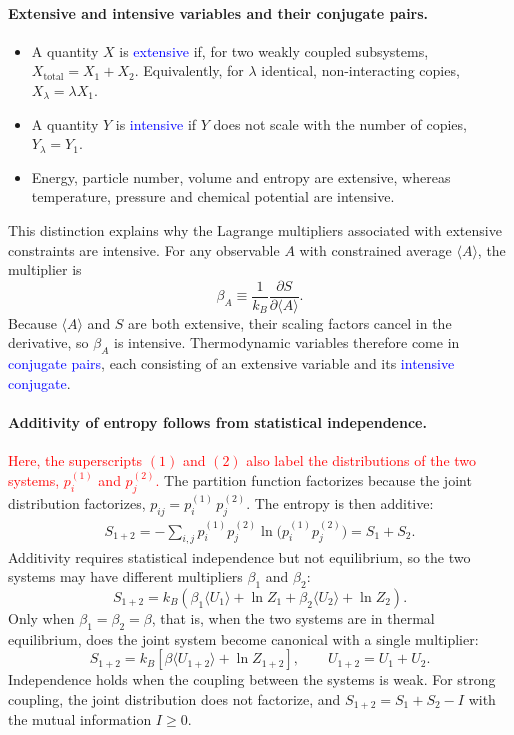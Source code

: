 \paragraph{Extensive and intensive variables and their conjugate pairs.}
\begin{itemize}
    \item A quantity $X$ is \textcolor{blue}{extensive} if, for two weakly
    coupled subsystems, $X_{\mathrm{total}}=X_1+X_2$. Equivalently, for
    $\lambda$ identical, non-interacting copies, $X_\lambda=\lambda X_1$.
    \item A quantity $Y$ is \textcolor{blue}{intensive} if $Y$ does not scale
    with the number of copies, $Y_\lambda=Y_1$.
    \item Energy, particle number, volume and entropy are extensive, whereas
    temperature, pressure and chemical potential are intensive.
\end{itemize}
This distinction explains why the Lagrange multipliers associated with
extensive constraints are intensive. For any observable $A$ with constrained
average $\langle A\rangle$, the multiplier is
\begin{equation*}
    \beta_A\equiv\frac{1}{k_B}\frac{\partial S}{\partial\langle A\rangle}.
\end{equation*}
Because $\langle A\rangle$ and $S$ are both extensive, their scaling factors
cancel in the derivative, so $\beta_A$ is intensive. Thermodynamic variables
therefore come in \textcolor{blue}{conjugate pairs}, each consisting of an
extensive variable and its \textcolor{blue}{intensive conjugate}.

\paragraph{Additivity of entropy follows from statistical independence.}
\textcolor{red}{Here, the superscripts $(1)$ and $(2)$ also label the
distributions of the two systems, $p^{(1)}_i$ and $p^{(2)}_j$.}
The partition function factorizes because the joint distribution
factorizes, $p_{ij}=p^{(1)}_i\,p^{(2)}_j$. The entropy is then additive:
\begin{align*}
    S_{1+2}
    = -\sum_{i,j} p^{(1)}_i p^{(2)}_j
    \ln\!\big(p^{(1)}_i p^{(2)}_j\big)
    = S_1+S_2.
\end{align*}
Additivity requires statistical independence but not equilibrium, so the two
systems may have different multipliers $\beta_1$ and $\beta_2$:
\begin{equation}
    \boxed{S_{1+2}=k_B\left(\beta_1\langle U_1\rangle+\ln Z_1
    +\beta_2\langle U_2\rangle+\ln Z_2\right).}
\end{equation}
Only when $\beta_1=\beta_2=\beta$, that is, when the two systems are in
thermal equilibrium, does the joint system become canonical with a single
multiplier:
\begin{equation}
    \boxed{S_{1+2}=k_B\left[\beta\langle U_{1+2}\rangle+\ln Z_{1+2}\right],
    \qquad U_{1+2}=U_1+U_2.}
\end{equation}
Independence holds when the coupling between the systems is weak. For strong
coupling, the joint distribution does not factorize, and
$S_{1+2}=S_1+S_2-I$ with the mutual information $I\geq0$.

